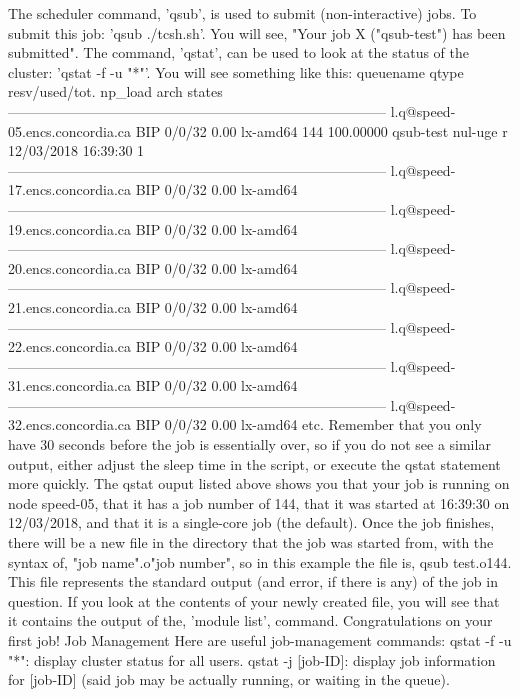The scheduler command, 'qsub', is used to submit (non-interactive) jobs. To submit this  job: 'qsub ./tcsh.sh'. You will see, "Your job X ("qsub-test") has been submitted". The  command, 'qstat', can be used to look at the status of the cluster: 'qstat -f -u "*"'. You will  see something like this: 
queuename qtype resv/used/tot. np_load arch states --------------------------------------------------------------------------------- 
l.q@speed-05.encs.concordia.ca BIP 0/0/32 0.00 lx-amd64   144 100.00000 qsub-test nul-uge r 12/03/2018 16:39:30 1 --------------------------------------------------------------------------------- 
l.q@speed-17.encs.concordia.ca BIP 0/0/32 0.00 lx-amd64  --------------------------------------------------------------------------------- 
l.q@speed-19.encs.concordia.ca BIP 0/0/32 0.00 lx-amd64  --------------------------------------------------------------------------------- 
l.q@speed-20.encs.concordia.ca BIP 0/0/32 0.00 lx-amd64  --------------------------------------------------------------------------------- 
l.q@speed-21.encs.concordia.ca BIP 0/0/32 0.00 lx-amd64  --------------------------------------------------------------------------------- 
l.q@speed-22.encs.concordia.ca BIP 0/0/32 0.00 lx-amd64  --------------------------------------------------------------------------------- 
l.q@speed-31.encs.concordia.ca BIP 0/0/32 0.00 lx-amd64  --------------------------------------------------------------------------------- 
l.q@speed-32.encs.concordia.ca BIP 0/0/32 0.00 lx-amd64  etc. 
Remember that you only have 30 seconds before the job is essentially over, so if you  do not see a similar output, either adjust the sleep time in the script, or execute the  qstat statement more quickly. The qstat ouput listed above shows you that your job is 
running on node speed-05, that it has a job number of 144, that it was started at  16:39:30 on 12/03/2018, and that it is a single-core job (the default).  
Once the job finishes, there will be a new file in the directory that the job was started  from, with the syntax of, "job name".o"job number", so in this example the file is, qsub test.o144. This file represents the standard output (and error, if there is any) of the job  in question. If you look at the contents of your newly created file, you will see that it  contains the output of the, 'module list', command. 
Congratulations on your first job! 
Job Management 
Here are useful job-management commands: 
qstat -f -u "*": display cluster status for all users. 
qstat -j [job-ID]: display job information for [job-ID] (said job may be actually running, or  waiting in the queue). 
